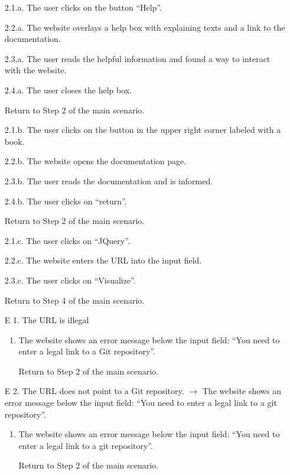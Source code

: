 \documentclass[11pt]{scrartcl}
\begin{document}
\begin{description}[leftmargin=!,labelwidth=\widthof{\bfseries Frequency of use:}]
		
	\item[Alternate Flow:]
		\begin{enumerate}
			\item[2.1.a.] The user clicks on the button \enquote{Help}.
			\item[2.2.a.] The website overlays a help box with explaining texts and a link to the documentation.
			\item[2.3.a.] The user reads the helpful information and found a way to interact with the website.
			\item[2.4.a.] The user closes the help box.
			\item[] Return to Step 2 of the main scenario.
			\\
			\item[2.1.b.] The user clicks on the button in the upper right corner labeled with a book.
			\item[2.2.b.] The website opens the documentation page.
			\item[2.3.b.] The user reads the documentation and is informed.
			\item[2.4.b.] The user clicks on \enquote{return}.
			\item[] Return to Step 2 of the main scenario.
			\\
			\item[2.1.c.] The user clicks on \enquote{JQuery}.
			\item[2.2.c.] The website enters the URL into the input field.
			\item[2.3.c.] The user clicks on \enquote{Visualize}.
			\item[] Return to Step 4 of the main scenario.
			
		
		\end{enumerate}

	\item[Exception Flow:]
		\begin{enumerate}[leftmargin=1.5em]
			\item[E 1.] The URL is illegal
			\begin{enumerate}
				\item The website shows an error message below the input field: \enquote{You need to enter a legal link to a Git 						repository}.
				\item[] Return to Step 2 of the main scenario.
			\end{enumerate}
			
			\item[E 2.] The URL does not point to a Git repository. $\rightarrow$  The website
				shows an error message below the input field: \enquote{You need to enter a legal 		
				link to a git repository}.
				\begin{enumerate}
					\item The website shows an error message below the input field: \enquote{You need to enter a legal 		
						link to a git repository}.
					\item[] Return to Step 2 of the main scenario.
				\end{enumerate}
				

\end{enumerate}
\end{description}
\end{document}
